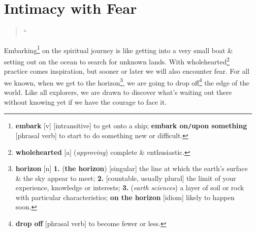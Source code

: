 \documentclass[oneside]{book}
\numberwithin{equation}{section}
\begin{document}
\section{Intimacy with Fear}
\begin{quotation}
	``
\end{quotation}
Embarking\footnote{\textbf{embark} [v] [intransitive] to get onto a ship; \textbf{embark on\texttt{/}upon something} [phrasal verb] to start to do something new or difficult.} on the spiritual journey is like getting into a very small boat \& setting out on the ocean to search for unknown lands. With wholehearted\footnote{\textbf{wholehearted} [a] (\textit{approving}) complete \& enthusiastic.} practice comes inspiration, but sooner or later we will also encounter fear. For all we known, when we get to the horizon\footnote{\textbf{horizon} [n] \textbf{1.} (\textbf{the horizon}) [singular] the line at which the earth's surface \& the sky appear to meet; \textbf{2.} [countable, usually plural] the limit of your experience, knowledge or interests; \textbf{3.} (\textit{earth sciences}) a layer of soil or rock with particular characteristics; \textbf{on the horizon} [idiom] likely to happen soon.}, we are going to drop off\footnote{\textbf{drop off} [phrasal verb] to become fewer or less.} the edge of the world. Like all explorers, we are drawn to discover what's waiting out there without knowing yet if we have the courage to face it.
\end{document}
